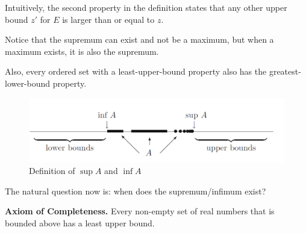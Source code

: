 \documentclass[tikz,12pt,a4paper]{article}
\theoremstyle{definition}
\newtheorem{theorem}{Theorem}[section]
\newtheorem{definition}{Definition}[section]
\begin{document}
Intuitively, the second property in the definition states that any other upper bound $z'$ for $E$ is larger than or equal to $z$.

Notice that the supremum can exist and not be a maximum, but when a maximum exists, it is also the supremum.

Also, every ordered set with a least-upper-bound property also has the greatest-lower-bound property.

\begin{figure}[h]
  \centering
  \includegraphics[width=\textwidth]{sup-inf}
  \caption{Definition of $\sup A$ and $\inf A$ \cite{abbott2001understanding}}
  \label{fig:sup-inf}
\end{figure}

%
%

The natural question now is: when does the supremum/infimum exist?

\textbf{Axiom of Completeness.} Every non-empty set of real numbers that is bounded above has a least upper bound.


%
\end{document}
